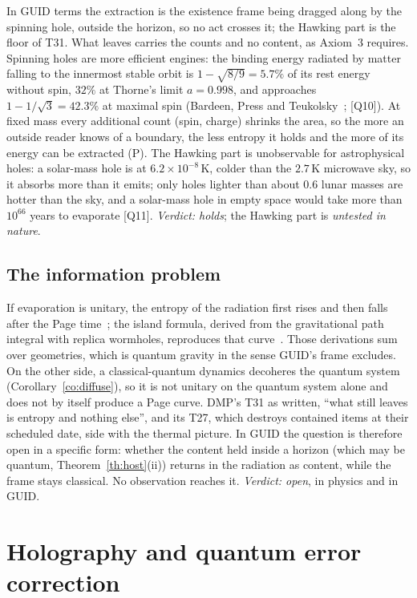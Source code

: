 \documentclass[11pt,a4paper]{article}
\theoremstyle{definition}
\theoremstyle{remark}
\newcommand{\chk}[1]{\textsf{[#1]}}
\newcommand{\tagP}{\textsf{(P)}}
\theoremstyle{definition}
\begin{document}
In GUID terms the extraction is the existence frame being dragged along by the spinning hole, outside the horizon, so no act crosses it; the
Hawking part is the floor of T31. What leaves carries the counts and no content, as Axiom~3 requires. Spinning holes are more efficient
engines: the binding energy radiated by matter falling to the innermost stable orbit is $1-\sqrt{8/9}=5.7\%$ of its rest energy without
spin, $32\%$ at Thorne's limit $a=0.998$, and approaches $1-1/\sqrt3=42.3\%$ at maximal spin (Bardeen, Press and Teukolsky~\cite{bpt};
\chk{Q10}). At fixed mass every additional count (spin, charge) shrinks the area, so the more an outside reader knows of a boundary, the
less entropy it holds and the more of its energy can be extracted \tagP. The Hawking part is unobservable for astrophysical holes: a
solar-mass hole is at $6.2\times10^{-8}$\,K, colder than the $2.7$\,K microwave sky, so it absorbs more than it emits; only holes lighter
than about $0.6$ lunar masses are hotter than the sky, and a solar-mass hole in empty space would take more than $10^{66}$ years to
evaporate \chk{Q11}. \emph{Verdict: holds}; the Hawking part is \emph{untested in nature}.

\subsection{The information problem}

If evaporation is unitary, the entropy of the radiation first rises and then falls after the Page time~\cite{page93}; the island formula,
derived from the gravitational path integral with replica wormholes, reproduces that curve~\cite{penington,aemm}. Those derivations sum
over geometries, which is quantum gravity in the sense GUID's frame excludes. On the other side, a classical-quantum dynamics decoheres the
quantum system (Corollary~\ref{co:diffuse}), so it is not unitary on the quantum system alone and does not by itself produce a Page curve.
DMP's T31 as written, ``what still leaves is entropy and nothing else'', and its T27, which destroys contained items at their scheduled date,
side with the thermal picture. In GUID the question is therefore open in a specific form: whether the content held inside a horizon (which
may be quantum, Theorem~\ref{th:host}(ii)) returns in the radiation as content, while the frame stays classical. No observation reaches it.
\emph{Verdict: open}, in physics and in GUID.

\section{Holography and quantum error correction}\label{sec:holo}
\end{document}
